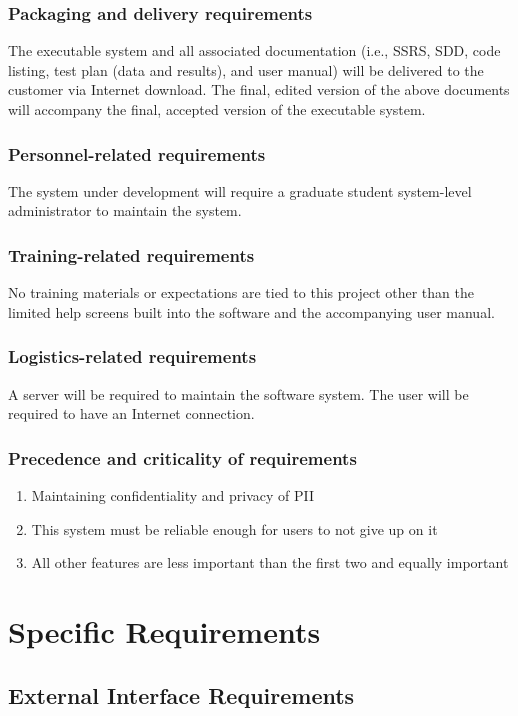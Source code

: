 \documentclass[12pt, oneside, letterpaper]{report}
\begin{document}
		\subsection{Packaging and delivery requirements}
			The executable system and all associated documentation (i.e.,
			SSRS, SDD, code listing, test plan (data and results), and
			user manual) will be delivered to the customer via Internet
			download. The final, edited version of the above documents
			will accompany the final, accepted version of the executable system.
		\subsection{Personnel-related requirements}
			The system under development will require a graduate student
			system-level administrator to maintain the system.
		\subsection{Training-related requirements}
			No training materials or expectations are tied to this
			project other than the limited help screens built into the
			software and the accompanying user manual.
		\subsection{Logistics-related requirements}
			A server will be required to maintain the software system.
			The user will be required to have an Internet connection.
		\subsection{Precedence and criticality of requirements}
			\begin{enumerate}
				\item Maintaining confidentiality and privacy of PII
				\item This system must be reliable enough for users to not
					give up on it
				\item All other features are less important than the first
					two and equally important
			\end{enumerate}
\chapter{Specific Requirements}
	\section{External Interface Requirements}
\end{document}

